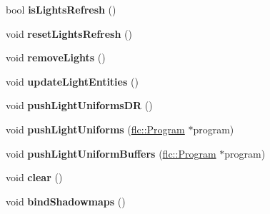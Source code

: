 \begin{DoxyCompactItemize}
\item 
bool {\bfseries is\+Lights\+Refresh} ()\hypertarget{classflw_1_1flf_1_1LightSystem_a7651524658ab9cb67409d2a7a3b40785}{}\label{classflw_1_1flf_1_1LightSystem_a7651524658ab9cb67409d2a7a3b40785}

\item 
void {\bfseries reset\+Lights\+Refresh} ()\hypertarget{classflw_1_1flf_1_1LightSystem_a88558cb8efc715a0d0af143c55266904}{}\label{classflw_1_1flf_1_1LightSystem_a88558cb8efc715a0d0af143c55266904}

\item 
void {\bfseries remove\+Lights} ()\hypertarget{classflw_1_1flf_1_1LightSystem_acf0550d7bd5a1e1594a3327252d4c73f}{}\label{classflw_1_1flf_1_1LightSystem_acf0550d7bd5a1e1594a3327252d4c73f}

\item 
void {\bfseries update\+Light\+Entities} ()\hypertarget{classflw_1_1flf_1_1LightSystem_aacee6250b5bd3879a9ebd742181d9bd9}{}\label{classflw_1_1flf_1_1LightSystem_aacee6250b5bd3879a9ebd742181d9bd9}

\item 
void {\bfseries push\+Light\+Uniforms\+DR} ()\hypertarget{classflw_1_1flf_1_1LightSystem_aec0348329c501772f89787d1b0d145d0}{}\label{classflw_1_1flf_1_1LightSystem_aec0348329c501772f89787d1b0d145d0}

\item 
void {\bfseries push\+Light\+Uniforms} (\hyperlink{classflw_1_1flc_1_1Program}{flc\+::\+Program} $\ast$program)\hypertarget{classflw_1_1flf_1_1LightSystem_aae4432792a7c0048d0b9ce8f42c486d2}{}\label{classflw_1_1flf_1_1LightSystem_aae4432792a7c0048d0b9ce8f42c486d2}

\item 
void {\bfseries push\+Light\+Uniform\+Buffers} (\hyperlink{classflw_1_1flc_1_1Program}{flc\+::\+Program} $\ast$program)\hypertarget{classflw_1_1flf_1_1LightSystem_a80af6b13ff567db8dc821fce8bd4d64f}{}\label{classflw_1_1flf_1_1LightSystem_a80af6b13ff567db8dc821fce8bd4d64f}

\item 
void {\bfseries clear} ()\hypertarget{classflw_1_1flf_1_1LightSystem_a2af93a35df56344840ceeeaaca9ea1e9}{}\label{classflw_1_1flf_1_1LightSystem_a2af93a35df56344840ceeeaaca9ea1e9}

\item 
void {\bfseries bind\+Shadowmaps} ()\hypertarget{classflw_1_1flf_1_1LightSystem_abe92c7226cc53a7ed44e32d74191aaf5}{}\label{classflw_1_1flf_1_1LightSystem_abe92c7226cc53a7ed44e32d74191aaf5}


\end{DoxyCompactItemize}
